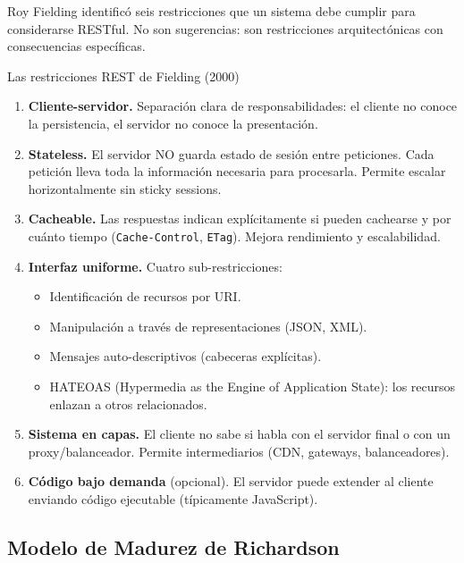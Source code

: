 \documentclass[11pt,a4paper,openany]{book}
\begin{document}
Roy Fielding identificó seis restricciones que un sistema debe
cumplir para considerarse RESTful. No son sugerencias: son
restricciones arquitectónicas con consecuencias específicas.

\begin{cajadefinicion}{Las restricciones REST de Fielding (2000)}
\begin{enumerate}
\item \textbf{Cliente-servidor.} Separación clara de
responsabilidades: el cliente no conoce la persistencia, el servidor
no conoce la presentación.

\item \textbf{Stateless.} El servidor NO guarda estado de sesión
entre peticiones. Cada petición lleva toda la información necesaria
para procesarla. Permite escalar horizontalmente sin sticky sessions.

\item \textbf{Cacheable.} Las respuestas indican explícitamente si
pueden cachearse y por cuánto tiempo (\texttt{Cache-Control},
\texttt{ETag}). Mejora rendimiento y escalabilidad.

\item \textbf{Interfaz uniforme.} Cuatro sub-restricciones:
\begin{itemize}
\item Identificación de recursos por URI.
\item Manipulación a través de representaciones (JSON, XML).
\item Mensajes auto-descriptivos (cabeceras explícitas).
\item HATEOAS (Hypermedia as the Engine of Application State):
los recursos enlazan a otros relacionados.
\end{itemize}

\item \textbf{Sistema en capas.} El cliente no sabe si habla con el
servidor final o con un proxy/balanceador. Permite intermediarios
(CDN, gateways, balanceadores).

\item \textbf{Código bajo demanda} (opcional). El servidor puede
extender al cliente enviando código ejecutable (típicamente
JavaScript).
\end{enumerate}
\end{cajadefinicion}

\subsection{Modelo de Madurez de Richardson}
\end{document}
